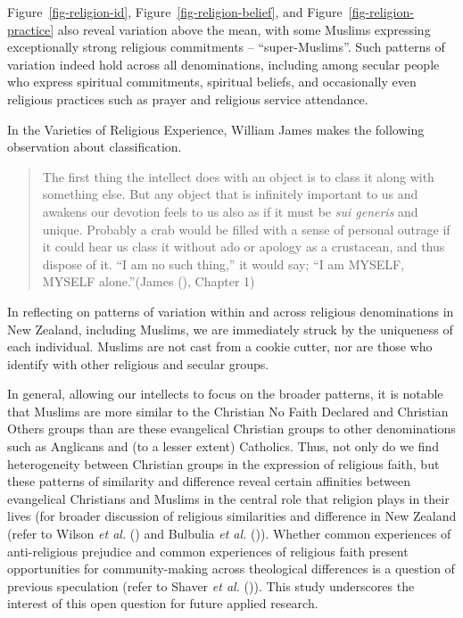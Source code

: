 \documentclass[
  single column]{article}
\begin{document}
Figure~\ref{fig-religion-id}, Figure~\ref{fig-religion-belief}, and
Figure~\ref{fig-religion-practice} also reveal variation above the mean,
with some Muslims expressing exceptionally strong religious commitments
-- ``super-Muslims''. Such patterns of variation indeed hold across all
denominations, including among secular people who express spiritual
commitments, spiritual beliefs, and occasionally even religious
practices such as prayer and religious service attendance.

In the Varieties of Religious Experience, William James makes the
following observation about classification.

\begin{quote}
The first thing the intellect does with an object is to class it along
with something else. But any object that is infinitely important to us
and awakens our devotion feels to us also as if it must be \emph{sui
generis} and unique. Probably a crab would be filled with a sense of
personal outrage if it could hear us class it without ado or apology as
a crustacean, and thus dispose of it. ``I am no such thing,'' it would
say; ``I am MYSELF, MYSELF alone.''(James
(), Chapter 1)
\end{quote}

In reflecting on patterns of variation within and across religious
denominations in New Zealand, including Muslims, we are immediately
struck by the uniqueness of each individual. Muslims are not cast from a
cookie cutter, nor are those who identify with other religious and
secular groups.

In general, allowing our intellects to focus on the broader patterns, it
is notable that Muslims are more similar to the Christian No Faith
Declared and Christian Others groups than are these evangelical
Christian groups to other denominations such as Anglicans and (to a
lesser extent) Catholics. Thus, not only do we find heterogeneity
between Christian groups in the expression of religious faith, but these
patterns of similarity and difference reveal certain affinities between
evangelical Christians and Muslims in the central role that religion
plays in their lives (for broader discussion of religious similarities
and difference in New Zealand (refer to Wilson \emph{et al.}
() and Bulbulia \emph{et al.}
()). Whether common experiences
of anti-religious prejudice and common experiences of religious faith
present opportunities for community-making across theological
differences is a question of previous speculation (refer to Shaver
\emph{et al.} ()). This study
underscores the interest of this open question for future applied
research.
\end{document}
